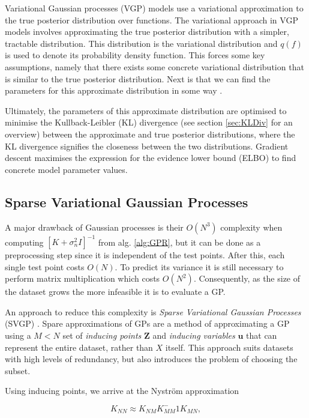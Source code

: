 \documentclass[12pt,a4paper]{report}
\theoremstyle{definition}
\begin{document}
Variational Gaussian processes (VGP) models use a variational approximation to the true posterior distribution over functions.
The variational approach in VGP models involves approximating the true posterior distribution with a simpler, tractable distribution. 
This distribution is the variational distribution and $q(f)$ is used to denote its probability density function.
This forces some key assumptions, namely that there exists some concrete variational distribution that is similar to the true posterior distribution. 
Next is that we can find the parameters for this approximate distribution in some way \citep{Yi2020}.

Ultimately, the parameters of this approximate distribution are optimised to minimise the Kullback-Leibler (KL) divergence (see section \ref{sec:KLDiv} for an overview) between the approximate and true posterior distributions, where the KL divergence signifies the closeness between the two distributions.
Gradient descent maximises the expression for the evidence lower bound (ELBO) to find concrete model parameter values.

\subsection{Sparse Variational Gaussian Processes}

A major drawback of Gaussian processes is their $O(N^3)$ complexity when computing $[K + \sigma_{n}^2I]^{-1}$ from alg. \ref{alg:GPR}, but it can be done as a preprocessing step since it is independent of the test points. 
After this, each single test point costs $O(N)$. 
To predict its variance it is still necessary to perform matrix multiplication which costs $O(N^2)$.
Consequently, as the size of the dataset grows the more infeasible it is to evaluate a GP.

An approach to reduce this complexity is \emph{Sparse Variational Gaussian Processes} (SVGP) \citep{Hensman2014}.
Spare approximations of GPs are a method of approximating a GP using a $M < N$ set of \emph{inducing points} $\textbf{Z}$ and \emph{inducing variables} $\textbf{u}$ that can represent the entire dataset, rather than $X$ itself. 
This approach suits datasets with high levels of redundancy, but also introduces the problem of choosing the subset.

Using inducing points, we arrive at the Nystr{\"o}m approximation

\begin{equation}
	K_{NN} \approx K_{NM} K_{MM}^-1 K_{MN},
\end{equation}
\end{document}
